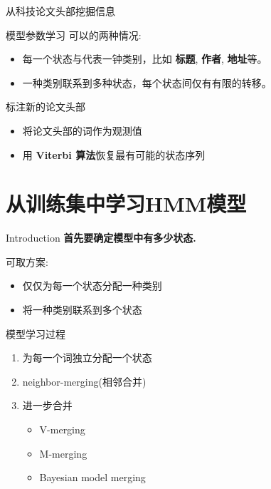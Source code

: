 \documentclass{beamer}
\begin{document}
\begin{frame}{ 从科技论文头部挖掘信息}
    \begin{block}{模型参数学习}
        可以的两种情况:
        \begin{itemize}
            \item 每一个状态与代表一钟类别，比如 \textbf{标题}, \textbf{作者}, \textbf{地址}等。
            \item 一种类别联系到多种状态，每个状态间仅有有限的转移。
        \end{itemize}
    \end{block}
    
    \begin{block}{ 标注新的论文头部}
        \begin{itemize}
            \item 将论文头部的词作为观测值
            \item 用 \textbf{Viterbi 算法}恢复最有可能的状态序列
        \end{itemize}
    \end{block}
\end{frame}

\section{从训练集中学习HMM模型}
\begin{frame}{Introduction}
    \textbf{首先要确定模型中有多少状态.}
    \begin{block}{可取方案:}
        \begin{itemize}
            \item 仅仅为每一个状态分配一种类别
            \item 将一种类别联系到多个状态
        \end{itemize}
    \end{block}
\end{frame}

\begin{frame}{模型学习过程}
    \begin{enumerate}
        \item 为每一个词独立分配一个状态
        \item neighbor-merging(相邻合并)
        \item 进一步合并
            \begin{itemize}
                \item V-merging
                \item M-merging
                \item Bayesian model merging
            \end{itemize}
    \end{enumerate}
\end{frame}
\end{document}
